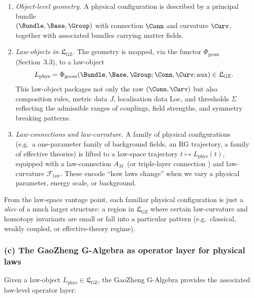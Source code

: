 \documentclass[11pt]{book}
\theoremstyle{plain}
\theoremstyle{definition}
\newcommand{\GZLS}{\ensuremath{\mathfrak{L}_{\mathrm{GZ}}}}       \newcommand{\GZLT}{\ensuremath{M_{!w}}}                           \newcommand{\GZLOC}{\ensuremath{A_M}}                             \newcommand{\GZLCurv}{\ensuremath{\mathcal{F}_{\mathrm{law}}}}
\begin{document}
\begin{enumerate}[label=\roman*)]
  \item \emph{Object-level geometry.}
        A physical configuration is described by a principal bundle \\ 
        $(\Bundle,\Base,\Group)$ with connection $\Conn$ and curvature
        $\Curv$, together with associated bundles carrying matter
        fields.
  \item \emph{Law-objects in \GZLS.}
        The geometry is mapped, via the functor
        $\Phi_{\mathrm{geom}}$ (Section~3.3), to a law-object
        \[
          L_{\mathrm{phys}}
          =
          \Phi_{\mathrm{geom}}(\Bundle,\Base,\Group;\Conn,\Curv;\text{aux})
          \in\GZLS.
        \]
        This law-object packages not only the raw $(\Conn,\Curv)$ but
        also composition rules, metric data $J$, localisation data
        $\mathrm{Loc}$, and thresholds $\Sigma$ reflecting the
        admissible ranges of couplings, field strengths, and symmetry
        breaking patterns.
  \item \emph{Law-connections and law-curvature.}
        A family of physical configurations (e.g.\ a one-parameter
        family of background fields, an RG trajectory, a family of
        effective theories) is lifted to a law-space trajectory
        $t\mapsto L_{\mathrm{phys}}(t)$, equipped with a law-connection
        \GZLOC\ (or triple-layer connection \GZTLC) and law-curvature
        \GZLCurv. These encode “how laws change” when we vary a
        physical parameter, energy scale, or background.
\end{enumerate}

From the law-space vantage point, each familiar physical configuration
is just a \emph{slice} of a much larger structure: a region in \GZLS
where certain law-curvature and homotopy invariants are small or fall
into a particular pattern (e.g.\ classical, weakly coupled, or
effective-theory regime).



\subsubsection*{(c) The GaoZheng G-Algebra as operator layer for physical laws}

Given a law-object $L_{\mathrm{phys}}\in\GZLS$, the GaoZheng G-Algebra
provides the associated law-level operator layer:
\end{document}
